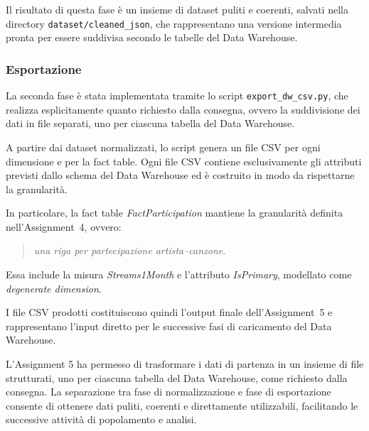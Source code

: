 Il risultato di questa fase è un insieme di dataset puliti e coerenti,
salvati nella directory \texttt{dataset/cleaned\_json}, che rappresentano
una versione intermedia pronta per essere suddivisa secondo le tabelle
del Data Warehouse.

\subsubsection*{Esportazione}

La seconda fase è stata implementata tramite lo script
\texttt{export\_dw\_csv.py}, che realizza esplicitamente quanto richiesto
dalla consegna, ovvero la suddivisione dei dati in file separati,
uno per ciascuna tabella del Data Warehouse.

A partire dai dataset normalizzati, lo script genera un file CSV per ogni
dimensione e per la fact table. Ogni file CSV contiene esclusivamente
gli attributi previsti dallo schema del Data Warehouse ed è costruito
in modo da rispettarne la granularità.

In particolare, la fact table \textit{FactParticipation} mantiene la
granularità definita nell’Assignment~4, ovvero:
\begin{quote}
\emph{una riga per partecipazione artista--canzone}.
\end{quote}
Essa include la misura \textit{Streams1Month} e l’attributo \textit{IsPrimary},
modellato come \textit{degenerate dimension}.

I file CSV prodotti costituiscono quindi l’output finale dell’Assignment~5
e rappresentano l’input diretto per le successive fasi di caricamento
del Data Warehouse.

L’Assignment 5 ha permesso di trasformare i dati di partenza in un insieme
di file strutturati, uno per ciascuna tabella del Data Warehouse,
come richiesto dalla consegna. La separazione tra fase di normalizzazione
e fase di esportazione consente di ottenere dati puliti, coerenti e
direttamente utilizzabili, facilitando le successive attività di
popolamento e analisi.
